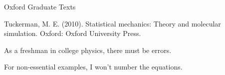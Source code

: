 
Oxford Graduate Texts

Tuckerman, M. E. (2010). Statistical mechanics: Theory and molecular simulation. Oxford: Oxford University Press.

As a freshman in college physics, there must be errors.

For non-essential examples, I won't number the equations.